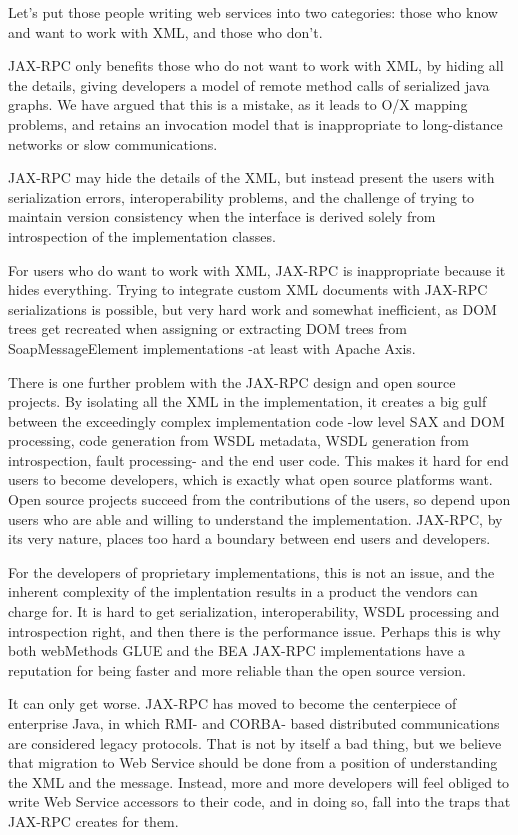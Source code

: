 \documentclass[draft]{article}
\begin{document}
Let's put those people writing web services into two categories: those
who know and want to work with XML, and those who don't. 

JAX-RPC only benefits those who do not want to work with XML, by hiding
all the details, giving developers a model of remote method calls of
serialized java graphs. We have argued that this is a mistake, 
as it leads to O/X mapping problems, and retains an invocation model
that is inappropriate to long-distance networks or slow communications. 

JAX-RPC may hide the details of the XML, but instead present the users
with serialization errors, interoperability problems, and the challenge
of trying to maintain version consistency when the interface is derived
solely from introspection of the implementation classes.


For users who do want to work with XML, JAX-RPC is inappropriate because
it hides everything. Trying to integrate custom XML documents with
JAX-RPC serializations is possible, but very hard work and somewhat
inefficient, as DOM trees get recreated when assigning or extracting DOM
trees from SoapMessageElement implementations -at least with Apache
Axis.

There is one further problem with the JAX-RPC design and open source
projects. By isolating all the XML in the implementation, it creates a
big gulf between the exceedingly complex implementation code -low level
SAX and DOM processing, code generation from WSDL metadata, WSDL
generation from introspection, fault processing- and the end user code.
This makes it hard for end users to become developers, which is exactly
what open source platforms want. Open source projects succeed from the
contributions of the users, so depend upon users who are able and
willing to understand the implementation. JAX-RPC, by its very nature,
places too hard a boundary between end users and developers.

For the developers of proprietary implementations, this is not an issue,
and the inherent complexity of the implentation results in a product the
vendors can charge for. It is hard to get serialization,
interoperability, WSDL processing and introspection right, and then
there is the performance issue. Perhaps this is why both webMethods GLUE
and the BEA JAX-RPC implementations have a reputation for being faster
and more reliable than the open source version. 

It can only get worse. JAX-RPC has moved to become the centerpiece of
enterprise Java, in which RMI- and CORBA- based distributed
communications are considered legacy protocols. That is not by itself a
bad thing, but we believe that migration to Web Service should be done
from a position of understanding the XML and the message. Instead, more
and more developers will feel obliged to write Web Service accessors to
their code, and in doing so, fall into the traps that JAX-RPC creates
for them.
\end{document}
